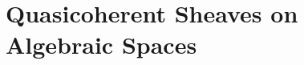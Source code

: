 \section{Quasicoherent Sheaves on Algebraic Spaces}\label{sec: quasicoherent sheaves on algebraic spaces}
